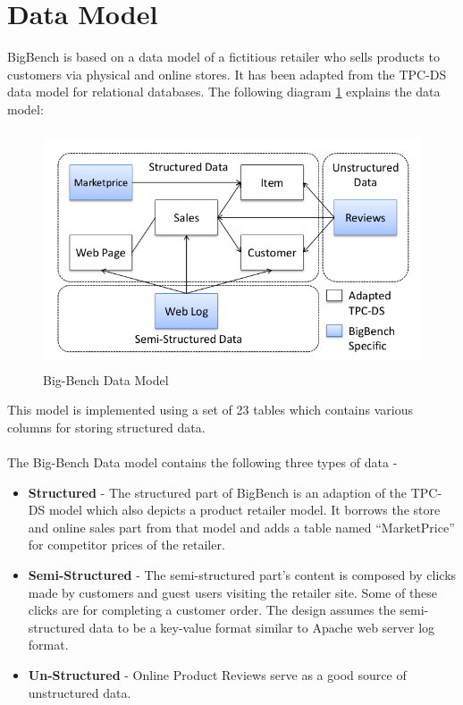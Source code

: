 \documentclass[12pt]{book}
\begin{document}
\section{Data Model}
BigBench is based on a data model of a fictitious retailer who sells products to customers via physical and online stores.
It has been adapted from the TPC-DS data model for relational databases.
The following diagram \ref{schema} explains the data model:
\begin{figure}[hb]
 \centering
 \includegraphics[height=7cm,width=15cm]{Schema.png}
 \caption{Big-Bench Data Model \label{schema} \cite{ghazal}}
\end{figure}
\newpage
\noindent
This model is implemented using a set of 23 tables which contains various columns for storing structured data.
\\\noindent
\\\noindent
The Big-Bench Data model contains the following three types of data -
\begin{itemize}
 \item \textbf{Structured} - The structured part of BigBench is an adaption of the TPC-DS model which also depicts a product retailer model.
 It borrows the store and online sales part from that model and adds a table named ``MarketPrice'' for competitor prices of the retailer.
 \item \textbf{Semi-Structured} - The semi-structured part's content is composed by clicks made by customers and guest users visiting 
 the retailer site. Some of these clicks are for completing a customer order. The design assumes the semi-structured data to be a key-value 
 format similar to Apache web server log format.
 \item \textbf{Un-Structured} - Online Product Reviews serve as a good source of unstructured data.
\end{itemize}
\end{document}
